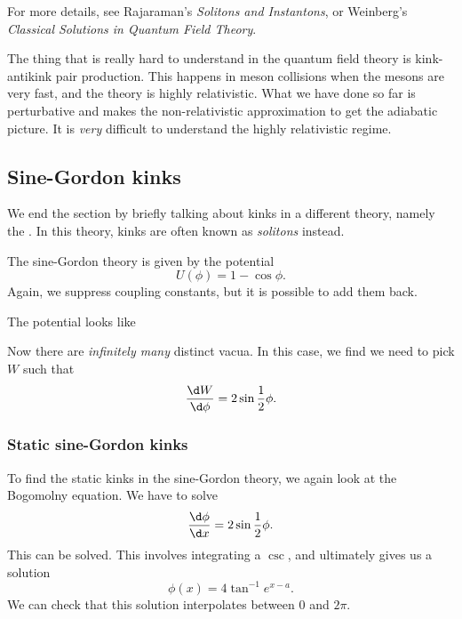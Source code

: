 \documentclass[a4paper]{article}
\begin{document}
For more details, see Rajaraman's \emph{Solitons and Instantons}, or Weinberg's \emph{Classical Solutions in Quantum Field Theory}.

The thing that is really hard to understand in the quantum field theory is kink-antikink pair production. This happens in meson collisions when the mesons are very fast, and the theory is highly relativistic. What we have done so far is perturbative and makes the non-relativistic approximation to get the adiabatic picture. It is \emph{very} difficult to understand the highly relativistic regime.

\subsection{Sine-Gordon kinks}
We end the section by briefly talking about kinks in a different theory, namely the . In this theory, kinks are often known as \emph{solitons} instead.

The sine-Gordon theory is given by the potential
\[
  U(\phi) = 1 - \cos \phi.
\]
Again, we suppress coupling constants, but it is possible to add them back.

The potential looks like
\begin{center}
\end{center}
Now there are \emph{infinitely many} distinct vacua. In this case, we find we need to pick $W$ such that
\[
  \frac{\d W}{\d \phi} = 2 \sin \frac{1}{2}\phi.
\]

\subsubsection*{Static sine-Gordon kinks}
To find the static kinks in the sine-Gordon theory, we again look at the Bogomolny equation. We have to solve
\[
  \frac{\d \phi}{\d x} = 2 \sin \frac{1}{2}\phi.
\]
This can be solved. This involves integrating a $\csc$, and ultimately gives us a solution
\[
  \phi(x) = 4 \tan^{-1} e^{x - a}.
\]
We can check that this solution interpolates between $0$ and $2\pi$.
\end{document}
